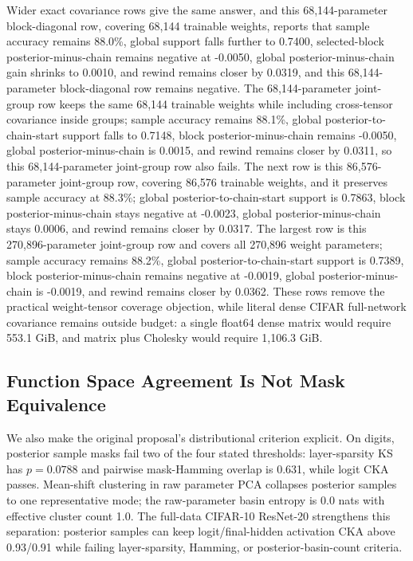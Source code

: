 \documentclass{article}
\begin{document}
Wider exact covariance rows give the same answer, and this 68,144-parameter
block-diagonal row, covering 68,144 trainable weights, reports that sample accuracy remains
88.0\%, global support falls further to 0.7400, selected-block
posterior-minus-chain remains negative at -0.0050, global
posterior-minus-chain gain shrinks to 0.0010, and rewind remains closer by
0.0319, and this 68,144-parameter block-diagonal row remains negative. The
68,144-parameter joint-group row keeps the same 68,144 trainable
weights while including cross-tensor covariance inside groups; sample accuracy
remains 88.1\%, global posterior-to-chain-start support falls to 0.7148, block
posterior-minus-chain remains -0.0050, global posterior-minus-chain is 0.0015,
and rewind remains closer by 0.0311, so this 68,144-parameter joint-group row
also fails. The next row is this 86,576-parameter joint-group row,
covering 86,576 trainable weights, and it preserves sample accuracy at 88.3\%; global
posterior-to-chain-start support is 0.7863, block posterior-minus-chain stays
negative at -0.0023, global posterior-minus-chain stays 0.0006, and rewind
remains closer by 0.0317. The largest row is this 270,896-parameter joint-group row and covers
all 270,896 weight parameters; sample accuracy remains 88.2\%, global
posterior-to-chain-start support is 0.7389, block posterior-minus-chain remains
negative at -0.0019, global posterior-minus-chain is -0.0019, and rewind
remains closer by 0.0362. These rows remove the practical weight-tensor coverage
objection, while literal dense CIFAR full-network covariance remains outside
budget: a single float64 dense matrix would require 553.1 GiB, and matrix plus
Cholesky would require 1,106.3 GiB.

\subsection{Function Space Agreement Is Not Mask Equivalence}

We also make the original proposal's distributional criterion explicit. On
digits, posterior sample masks fail two of the four stated thresholds:
layer-sparsity KS has $p=0.0788$ and pairwise mask-Hamming overlap is 0.631,
while logit CKA passes. Mean-shift clustering in raw parameter PCA collapses
posterior samples to one representative mode; the raw-parameter basin entropy is
0.0 nats with effective cluster count 1.0. The full-data CIFAR-10 ResNet-20
strengthens this separation: posterior samples can keep logit/final-hidden
activation CKA above 0.93/0.91 while failing layer-sparsity, Hamming, or
posterior-basin-count criteria.
\end{document}
